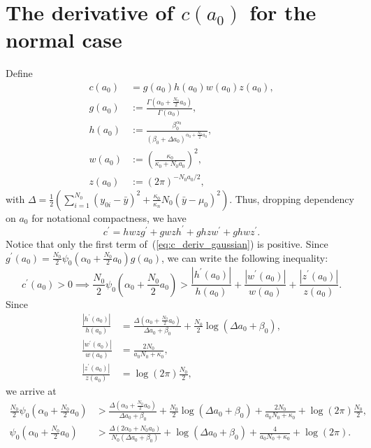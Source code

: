 \documentclass[a4paper, notitlepage, 11pt]{article}
\begin{document}
\section{The derivative of $c(a_0)$ for the normal case}
\label{sec:ca0_norm_deriv}
Define
\begin{align*}
 c(a_0) &= g(a_0)h(a_0)w(a_0)z(a_0), \\
 g(a_0) &:=  \frac{\Gamma\left( \alpha_0 + \frac{N_0}{2}a_0 \right)}{\Gamma(\alpha_0)}, \\
 h(a_0) &:= \frac{\beta_0^{\alpha_0}}{ \left(  \beta_0 + \Delta a_0\right)^{\alpha_0 + \frac{N_0}{2}a_0}}, \\
 w(a_0) &:= \left(\frac{\kappa_0}{\kappa_0 + N_0 a_0} \right)^2 , \\
 z(a_0) &:= (2\pi)^{-N_0 a_0/2}, 
\end{align*}
with $\Delta =  \frac{1}{2}\left( \sum_{i=1}^{N_0}(y_{0i}-\bar{y})^2 + \frac{\kappa_0}{\kappa_n} N_0 (\bar{y}-\mu_0)^2 \right)$.
Thus, dropping dependency on $a_0$ for notational compactness, we have
\begin{equation}
\label{eq:c_deriv_gaussian}
 c^\prime = h w z g^\prime + g w z h^\prime + g h z w^\prime + g h w z^\prime.
\end{equation}
Notice that only the first term of~(\ref{eq:c_deriv_gaussian}) is positive.
Since $g^\prime(a_0) = \frac{N_0}{2} \psi_0\left( \alpha_0 +  \frac{N_0}{2} a_0 \right)g(a_0)$, we can write the following inequality:
\begin{equation}
 c^\prime(a_0) > 0 \implies \frac{N_0}{2} \psi_0\left( \alpha_0 +  \frac{N_0}{2} a_0 \right) > \frac{|h^\prime(a_0)|}{h(a_0)} + \frac{|w^\prime(a_0)|}{w(a_0)} + \frac{|z^\prime(a_0)|}{z(a_0)}.
\end{equation}
Since
\begin{align}
 \frac{|h^\prime(a_0)|}{h(a_0)}  &=  \frac{\Delta\left( \alpha_0 + \frac{N_0}{2} a_0 \right) }{\Delta a_0 + \beta_0} + \frac{N_0}{2}\log{\left( \Delta a_0+ \beta_0 \right) }, \\
 \frac{|w^\prime(a_0)|}{w(a_0)}  &= \frac{2N_0}{a_0N_0+\kappa_0},\\
\frac{|z^\prime(a_0)|}{z(a_0)}  &= \log(2\pi) \frac{N_0}{2},
\end{align}
we arrive at
\begin{align}
 \frac{N_0}{2} \psi_0\left( \alpha_0 +  \frac{N_0}{2} a_0 \right) &>  \frac{\Delta\left( \alpha_0 + \frac{N_0}{2} a_0 \right) }{\Delta a_0 + \beta_0} + \frac{N_0}{2}\log{\left( \Delta a_0+ \beta_0 \right) } + \frac{2N_0}{a_0N_0+\kappa_0} + \log(2\pi) \frac{N_0}{2}, \\
\psi_0\left( \alpha_0 +  \frac{N_0}{2} a_0 \right) &>  \frac{\Delta\left( 2\alpha_0 + N_0a_0 \right) }{N_0\left(\Delta a_0 + \beta_0\right)} + \log{\left( \Delta a_0+ \beta_0 \right) } + \frac{4}{a_0N_0+\kappa_0} + \log(2\pi).
\end{align}
\end{document}
